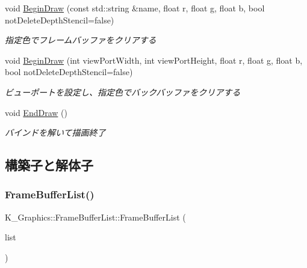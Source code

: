\begin{DoxyCompactItemize}
void \mbox{\hyperlink{class_k___graphics_1_1_frame_buffer_list_a2f45d6dd0bc044ebcbd2e2cd58b6786f}{Begin\+Draw}} (const std\+::string \&name, float r, float g, float b, bool not\+Delete\+Depth\+Stencil=false)
\begin{DoxyCompactList}\small\item\em 指定色でフレームバッファをクリアする \end{DoxyCompactList}\item 
void \mbox{\hyperlink{class_k___graphics_1_1_frame_buffer_list_aa850bab5299917ccd10a4f90439c733d}{Begin\+Draw}} (int view\+Port\+Width, int view\+Port\+Height, float r, float g, float b, bool not\+Delete\+Depth\+Stencil=false)
\begin{DoxyCompactList}\small\item\em ビューポートを設定し、指定色でバックバッファをクリアする \end{DoxyCompactList}\item 
void \mbox{\hyperlink{class_k___graphics_1_1_frame_buffer_list_a34e1278edf425c32aefd3e2684886930}{End\+Draw}} ()
\begin{DoxyCompactList}\small\item\em バインドを解いて描画終了 \end{DoxyCompactList}\end{DoxyCompactItemize}


\subsection{構築子と解体子}
\mbox{\label{class_k___graphics_1_1_frame_buffer_list_adde18222008a5b4d2962b6432c9eea4f}} 
\subsubsection{\texorpdfstring{Frame\+Buffer\+List()}{FrameBufferList()}}
{\footnotesize\ttfamily K\+\_\+\+Graphics\+::\+Frame\+Buffer\+List\+::\+Frame\+Buffer\+List (\begin{DoxyParamCaption}\item[{\mbox{\hyperlink{class_k___graphics_1_1_texture_list}{Texture\+List}} $\ast$}]{list }\end{DoxyParamCaption})}



